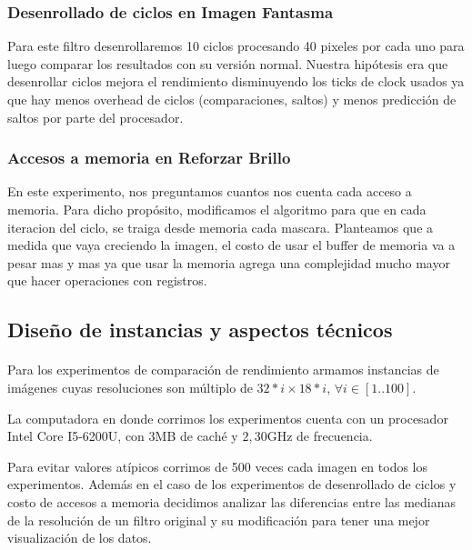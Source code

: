 \documentclass[a4paper]{article}
\begin{document}
\subsubsection{Desenrollado de ciclos en Imagen Fantasma}

Para este filtro desenrollaremos 10 ciclos procesando 40 pixeles por cada uno para luego comparar los resultados con su versi\'on normal. Nuestra hipótesis era que desenrollar ciclos mejora el rendimiento disminuyendo los ticks de clock usados ya que hay menos overhead de ciclos (comparaciones, saltos) y menos predicci\'on de saltos por parte del procesador.

\subsubsection{Accesos a memoria en Reforzar Brillo}

En este experimento, nos preguntamos cuantos nos cuenta cada acceso a memoria. Para dicho propósito, modificamos el algoritmo para que en cada iteracion del ciclo, se traiga desde memoria cada mascara. Planteamos que a medida que vaya creciendo la imagen, el costo de usar el buffer de memoria va a pesar mas y mas ya que usar la memoria agrega una complejidad mucho mayor que hacer operaciones con registros. 

\subsection{Dise\~no de instancias y aspectos t\'ecnicos}


\paragraph{} Para los experimentos de comparaci\'on de rendimiento armamos instancias de imágenes cuyas resoluciones son múltiplo de $32*i \times 18*i$, $\forall i \in [1..100]$.


La computadora en donde corrimos los experimentos cuenta con un procesador Intel Core I5-6200U, con 3MB de cach\'e y $2,30$GHz de frecuencia.


Para evitar valores at\'ipicos corrimos de 500 veces cada imagen en todos los experimentos. Adem\'as en el caso de los experimentos de desenrollado de ciclos y costo de accesos a memoria decidimos analizar las diferencias entre las medianas de la resoluci\'on de un filtro original y su modificaci\'on para tener una mejor visualizaci\'on de los datos.

\newpage
\end{document}
